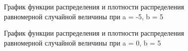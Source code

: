 \documentclass[14pt, a4paper]{extarticle}
\begin{document}
	\begin{figure}[h]
		\centering\caption{График функции распределения и плотности распределения равномерной случайной величины при a = -5, b = 5}
	\end{figure}
	
	\newpage
	
	\begin{figure}[h]
		\centering\caption{График функции распределения и плотности распределения равномерной случайной величины при a = 0, b = 5}
	\end{figure}
	
\end{document}
